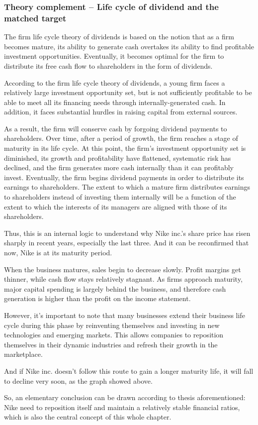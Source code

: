 \documentclass[a4paper, 12pt]{report}
\begin{document}
\subsubsection{Theory complement – Life cycle of dividend and the matched target}\par
The firm life cycle theory of dividends is based on the notion that as a firm becomes mature, its ability to generate cash overtakes its ability to find profitable investment opportunities. Eventually, it becomes optimal for the firm to distribute its free cash flow to shareholders in the form of dividends. \par
According to the firm life cycle theory of dividends, a young firm faces a relatively large investment opportunity set, but is not sufficiently profitable to be able to meet all its financing needs through internally-generated cash. In addition, it faces substantial hurdles in raising capital from external sources. \par
As a result, the firm will conserve cash by forgoing dividend payments to shareholders. Over time, after a period of growth, the firm reaches a stage of maturity in its life cycle. At this point, the firm’s investment opportunity set is diminished, its growth and profitability have flattened, systematic risk has declined, and the firm generates more cash internally than it can profitably invest. Eventually, the firm begins dividend payments in order to distribute its earnings to shareholders. The extent to which a mature firm distributes earnings to shareholders instead of investing them internally will be a function of the extent to which the interests of its managers are aligned with those of its shareholders.\par
Thus, this is an internal logic to understand why Nike inc.’s share price has risen sharply in recent years, especially the last three. And it can be reconfirmed that now, Nike is at its maturity period.\par
When the business matures, sales begin to decrease slowly. Profit margins get thinner, while cash flow stays relatively stagnant. As firms approach maturity, major capital spending is largely behind the business, and therefore cash generation is higher than the profit on the income statement.\par
However, it’s important to note that many businesses extend their business life cycle during this phase by reinventing themselves and investing in new technologies and emerging markets. This allows companies to reposition themselves in their dynamic industries and refresh their growth in the marketplace. \par
And if Nike inc. doesn’t follow this route to gain a longer maturity life, it will fall to decline very soon, as the graph showed above.\par
So, an elementary conclusion can be drawn according to thesis aforementioned: Nike need to reposition itself and maintain a relatively stable financial ratios, which is also the central concept of this whole chapter.
\end{document}
